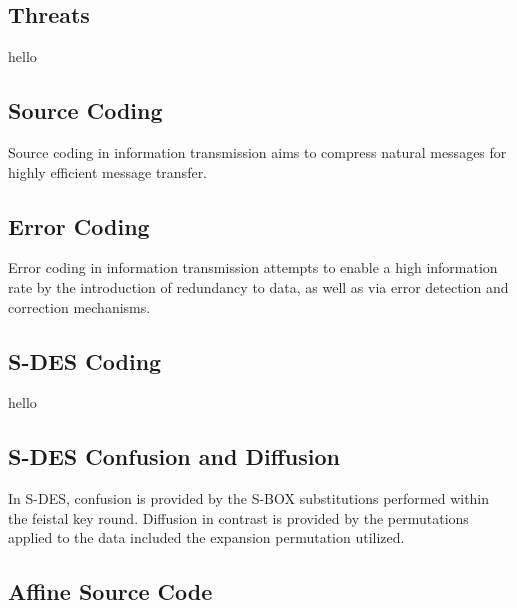\documentclass[]{article}
\begin{document}
\vspace*{0.8cm}
\subsection*{Threats}

hello \\

\subsection*{Source Coding}

Source coding in information transmission aims to compress natural messages for highly efficient message transfer.

\subsection*{Error Coding}

Error coding in information transmission attempts to enable a high information rate by the introduction of redundancy to data, as well as via error detection and correction mechanisms.

\subsection*{S-DES Coding}

hello \\

\subsection*{S-DES Confusion and Diffusion}

In S-DES, confusion is provided by the S-BOX substitutions performed within the feistal key round. Diffusion in contrast is provided by the permutations applied to the data included the expansion permutation utilized.

\pagebreak


\vspace*{-0.8cm}
\begin{center}
	\section*{Affine Source Code}
\end{center}
\end{document}
